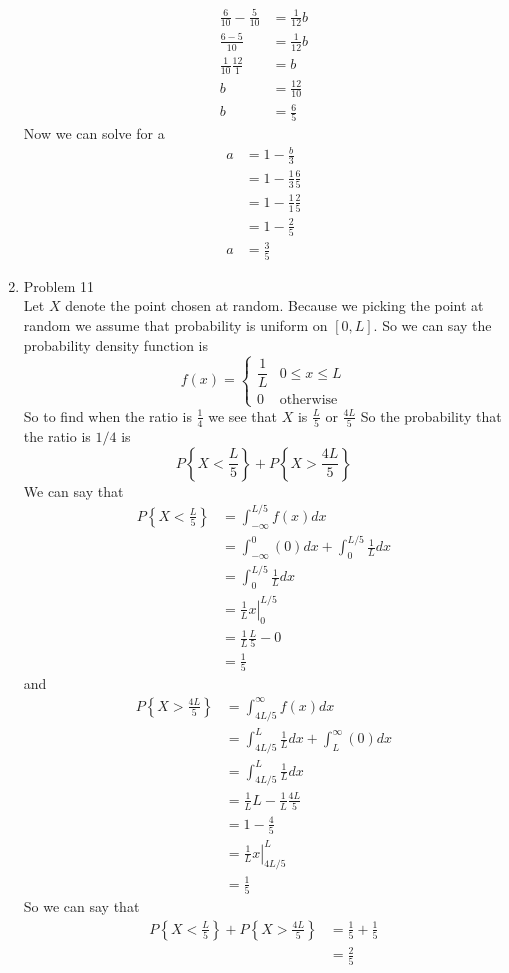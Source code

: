 \documentclass[11pt]{article}
\begin{document}
\begin{enumerate}
\begin{align*}
\frac{6}{10} - \frac{5}{10} &= \frac{1}{12}b\\
\frac{6-5}{10} &=  \frac{1}{12}b\\
\frac{1}{10}\frac{12}{1}&= b\\
b &= \frac{12}{10}\\
b &= \frac{6}{5}
\end{align*}
Now we can solve for a
\begin{align*}
a &= 1 - \frac{b}{3}\\
&= 1 - \frac{1}{3}\frac{6}{5}\\
&= 1 - \frac{1}{1}\frac{2}{5}\\
&= 1 - \frac{2}{5}\\
a&= \frac{3}{5}
\end{align*}

\item Problem 11\\
Let $X$ denote the point chosen at random. Because we picking the point at random we assume that probability is uniform on $[0,L]$. So we can say the probability density function is
$$f(x) = \left\{\begin{array}{cc}
	\dfrac{1}{L} &0\le x\le L\\
	0		&\mbox{otherwise}
	\end{array}\right.$$
So to find when the ratio is $\frac{1}{4}$ we see that $X$ is $\frac{L}{5}$ or $\frac{4L}{5}$ So the probability that the ratio is $1/4$ is 
$$P\left\{X<\frac{L}{5}\right\}+P\left\{X>\frac{4L}{5}\right\}$$
We can say that 
\begin{align*}
P\left\{X<\frac{L}{5}\right\} &= \int_{-\infty}^{L/5}f(x)dx\\
&= \int_{-\infty}^{0}(0)dx + \int_{0}^{L/5}\frac{1}{L}dx\\
&=\int_{0}^{L/5}\frac{1}{L}dx\\
&=\left.\frac{1}{L}x\right|_{0}^{L/5}\\
&=\frac{1}{L}\frac{L}{5} - 0\\
&=\frac{1}{5}
\end{align*}
and
\begin{align*}
P\left\{X>\frac{4L}{5}\right\} &= \int_{4L/5}^{\infty}f(x)dx\\
&= \int_{4L/5}^{L}\frac{1}{L}dx + \int_{L}^{\infty}(0)dx\\
&= \int_{4L/5}^{L}\frac{1}{L}dx\\
&=\frac{1}{L}L - \frac{1}{L}\frac{4L}{5}  \\
&=1 - \frac{4}{5}  \\
&=\left.\frac{1}{L}x\right|_{4L/5}^{L}\\
&=\frac{1}{5}
\end{align*}
So we can say that
\begin{align*}
P\left\{X<\frac{L}{5}\right\}+P\left\{X>\frac{4L}{5}\right\} &= \frac{1}{5}+\frac{1}{5}\\
&=\frac{2}{5}
\end{align*}


\end{enumerate}
\end{document}
